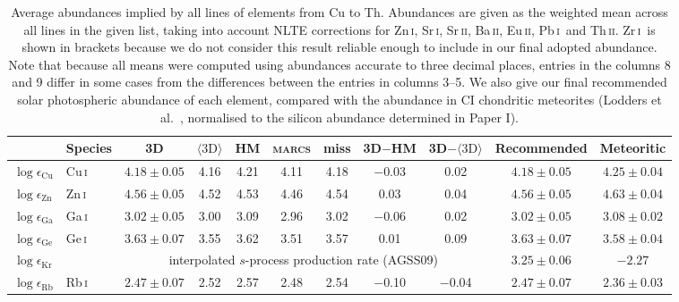 \documentclass[traditabstract]{aa}
\newcommand{\ph}{\phantom{$-$}}
\newcommand{\oneDAV}{$\langle\mathrm{3D}\rangle$}
\newcommand{\altcui}{Cu\,\textsc{i}}
\newcommand{\altzni}{Zn\,\textsc{i}}
\newcommand{\altgai}{Ga\,\textsc{i}}
\newcommand{\altgei}{Ge\,\textsc{i}}
\newcommand{\altrbi}{Rb\,\textsc{i}}
\newcommand{\altsri}{Sr\,\textsc{i}}
\newcommand{\altsrii}{Sr\,\textsc{ii}}
\newcommand{\altzri}{Zr\,\textsc{i}}
\newcommand{\altbaii}{Ba\,\textsc{ii}}
\newcommand{\altpbi}{Pb\,\textsc{i}}
\newcommand{\altthii}{Th\,\textsc{ii}}
\newcommand{\alteuii}{Eu\,\textsc{ii}}
\newcommand{\cui}{\altcui\ }
\newcommand{\zni}{\altzni\ }
\newcommand{\gai}{\altgai\ }
\newcommand{\gei}{\altgei\ }
\newcommand{\rbi}{\altrbi\ }
\newcommand{\zri}{\altzri\ }
\newcommand{\pbi}{\altpbi\ }
\begin{document}
\setcounter{table}{3}
\begin{table}[p]
\centering
\caption[Abundances implied by all lines]{Average abundances implied by all lines of elements from Cu to Th.  Abundances are given as the weighted mean across all lines in the given list, taking into account NLTE corrections for \altzni, \altsri, \altsrii, \altbaii, \alteuii, \pbi and \altthii.  \zri is shown in brackets because we do not consider this result reliable enough to include in our final adopted abundance.  Note that because all means were computed using abundances accurate to three decimal places, entries in the columns 8 and 9 differ in some cases from the differences between the entries in columns 3--5.  We also give our final recommended solar photospheric abundance of each element, compared with the abundance in CI chondritic meteorites (Lodders et al.\ \cite{lodd}, normalised to the silicon abundance determined in Paper I).}
\label{table:abuns}
\begin{tabular}{l l c c c c c c c c c}
\hline
\hline
& Species & 3D & \oneDAV & HM & \textsc{marcs} & {\sc miss} & 3D$-$HM & 3D$-$\oneDAV & Recommended & Meteoritic\\
\hline
$\log \epsilon_\mathrm{Cu}$     & \cui    & $4.18\pm0.05$ & 4.16 & 4.21 & 4.11 & 4.18 & $-$0.03 & \ph0.02 & $4.18\pm0.05$ & $4.25\pm0.04$\vspace{1mm}\\
$\log \epsilon_\mathrm{Zn}$     & \zni    & $4.56\pm0.05$ & 4.52 & 4.53 & 4.46 & 4.54 & \ph0.03 & \ph0.04 & $4.56\pm0.05$ & $4.63\pm0.04$\vspace{1mm}\\
$\log \epsilon_\mathrm{Ga}$     & \gai    & $3.02\pm0.05$ & 3.00 & 3.09 & 2.96 & 3.02 & $-$0.06 & \ph0.02 & $3.02\pm0.05$ & $3.08\pm0.02$\vspace{1mm}\\
$\log \epsilon_\mathrm{Ge}$     & \gei    & $3.63\pm0.07$ & 3.55 & 3.62 & 3.51 & 3.57 & \ph0.01 & \ph0.09 & $3.63\pm0.07$ & $3.58\pm0.04$\vspace{1mm}\\
$\log \epsilon_\mathrm{Kr}$     && \multicolumn{7}{c}{interpolated $s$-process production rate (AGSS09)}  & $3.25\pm0.06$ & $-2.27$      \vspace{1mm}\\
$\log \epsilon_\mathrm{Rb}$     & \rbi    & $2.47\pm0.07$ & 2.52 & 2.57 & 2.48 & 2.54 & $-$0.10 & $-$0.04 & $2.47\pm0.07$ & $2.36\pm0.03$\vspace{1mm}\\

\end{tabular}
\end{table}
\end{document}

